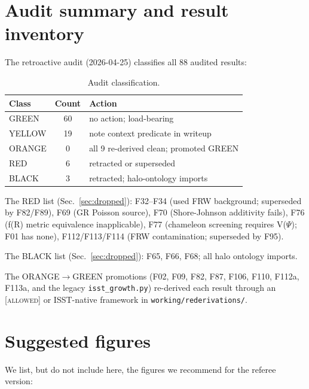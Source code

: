 \documentclass[aps,prd,twocolumn,nofootinbib,floatfix,superscriptaddress]{revtex4-2}
\begin{document}
\section{Audit summary and result inventory}
\label{app:audit}

The retroactive audit (2026-04-25) classifies all 88 audited results:

\begin{table}[h]
\caption{Audit classification.}
\label{tab:audit}
\begin{ruledtabular}
\begin{tabular}{lcl}
Class & Count & Action\\
\hline
GREEN & 60 & no action; load-bearing\\
YELLOW & 19 & note context predicate in writeup\\
ORANGE & 0 & all 9 re-derived clean; promoted GREEN\\
RED & 6 & retracted or superseded\\
BLACK & 3 & retracted; halo-ontology imports\\
\end{tabular}
\end{ruledtabular}
\end{table}

The RED list (Sec.~\ref{sec:dropped}): F32--F34 (used FRW background;
superseded by F82/F89), F69 (GR Poisson source), F70 (Shore-Johnson
additivity fails), F76 (f(R) metric equivalence inapplicable),
F77 (chameleon screening requires V($\Psi$); F01 has none),
F112/F113/F114 (FRW contamination; superseded by F95).

The BLACK list (Sec.~\ref{sec:dropped}): F65, F66, F68; all halo
ontology imports.

The ORANGE$\to$GREEN promotions (F02, F09, F82, F87, F106, F110,
F112a, F113a, and the legacy \texttt{isst\_growth.py}) re-derived
each result through an \textsc{[allowed]} or ISST-native framework
in \texttt{working/rederivations/}.

\section{Suggested figures}
\label{app:figures}

We list, but do not include here, the figures we recommend for the
referee version:
\end{document}
